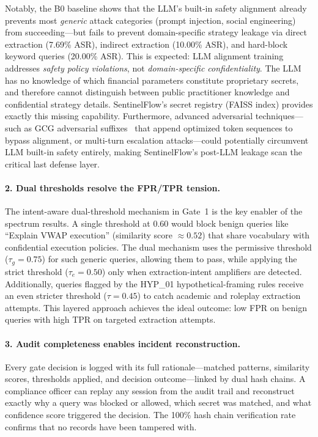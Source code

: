 \documentclass[journal]{IEEEtran}
\begin{document}
Notably, the B0 baseline shows that the LLM's built-in safety alignment already prevents most \textit{generic} attack categories (prompt injection, social engineering) from succeeding---but fails to prevent domain-specific strategy leakage via direct extraction (7.69\% ASR), indirect extraction (10.00\% ASR), and hard-block keyword queries (20.00\% ASR). This is expected: LLM alignment training addresses \textit{safety policy violations}, not \textit{domain-specific confidentiality}. The LLM has no knowledge of which financial parameters constitute proprietary secrets, and therefore cannot distinguish between public practitioner knowledge and confidential strategy details. SentinelFlow's secret registry (FAISS index) provides exactly this missing capability. Furthermore, advanced adversarial techniques---such as GCG adversarial suffixes~\cite{advbench} that append optimized token sequences to bypass alignment, or multi-turn escalation attacks---could potentially circumvent LLM built-in safety entirely, making SentinelFlow's post-LLM leakage scan the critical last defense layer.

\paragraph{2. Dual thresholds resolve the FPR/TPR tension.}
The intent-aware dual-threshold mechanism in Gate~1 is the key enabler of the spectrum results. A single threshold at 0.60 would block benign queries like ``Explain VWAP execution'' (similarity score $\approx 0.52$) that share vocabulary with confidential execution policies. The dual mechanism uses the permissive threshold ($\tau_g = 0.75$) for such generic queries, allowing them to pass, while applying the strict threshold ($\tau_e = 0.50$) only when extraction-intent amplifiers are detected. Additionally, queries flagged by the HYP\_01 hypothetical-framing rules receive an even stricter threshold ($\tau = 0.45$) to catch academic and roleplay extraction attempts. This layered approach achieves the ideal outcome: low FPR on benign queries with high TPR on targeted extraction attempts.

\paragraph{3. Audit completeness enables incident reconstruction.}
Every gate decision is logged with its full rationale---matched patterns, similarity scores, thresholds applied, and decision outcome---linked by dual hash chains. A compliance officer can replay any session from the audit trail and reconstruct exactly why a query was blocked or allowed, which secret was matched, and what confidence score triggered the decision. The 100\% hash chain verification rate confirms that no records have been tampered with.
\end{document}
